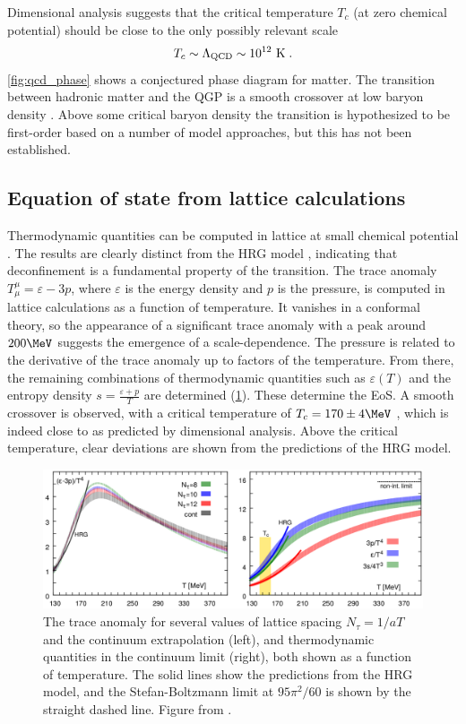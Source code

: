 Dimensional analysis suggests that the critical temperature $T_c$ (at zero chemical potential) should be close to the only possibly relevant scale
\[
T_c \sim \Lambda_\textrm{QCD} \sim 10^{12}~\mathrm{K}\; .
\]
\cref{fig:qcd_phase} shows a conjectured phase diagram for \qcd matter.
The transition between hadronic matter and the QGP is a smooth crossover at low baryon density \cite{Aoki:2006we}.
Above some critical baryon density the transition is hypothesized to be first-order based on a number of model approaches, but this has not been established.

\subsection{Equation of state from lattice calculations}
\label{subsec:lattice}

Thermodynamic quantities can be computed in lattice \qcd at small chemical potential \cite{Borsanyi:2013bia,Bazavov:2014pvz}.
The results are clearly distinct from the \ac{HRG} model \cite{Huovinen:2009yb}, indicating that deconfinement is a fundamental property of the transition.
The trace anomaly $T_\mu^\mu = \varepsilon - 3 p$, where $\varepsilon$ is the energy density and $p$ is the pressure, is computed in lattice calculations as a function of temperature.
It vanishes in a conformal theory, so the appearance of a significant trace anomaly with a peak around $200 \MeV$ suggests the emergence of a scale-dependence.
The pressure is related to the derivative of the trace anomaly up to factors of the temperature.
From there, the remaining combinations of thermodynamic quantities such as $\varepsilon(T)$ and the entropy density $s = \frac{\varepsilon + p}{T}$ are determined  (\cref{fig:lattice_eos}).
These determine the \ac{EoS}.
A smooth crossover is observed, with a critical temperature of \( T_c = 170 \pm 4 \MeV \) \cite{Aoki:2009sc}, which is indeed close to \lqcd as predicted by dimensional analysis.
Above the critical temperature, clear deviations are shown from the predictions of the \ac{HRG} model.

\begin{figure}[t]
  \includegraphics[width=\linewidth]{lattice_eos.png}
  \caption{The trace anomaly for several values of lattice spacing $N_\tau = 1/aT$ and the continuum extrapolation (left), and thermodynamic quantities in the continuum limit (right), both shown as a function of temperature. The solid lines show the predictions from the HRG model, and the Stefan-Boltzmann limit at $95\pi^2/60$ is shown by the straight dashed line. Figure from .}
  \label{fig:lattice_eos}
\end{figure}

